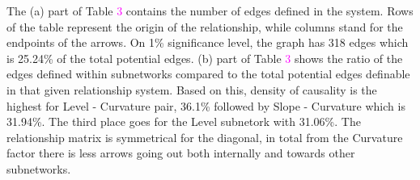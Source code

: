 \documentclass[12pt,bibliography=totoc]{article}
\begin{document}

\bigskip


The (a) part of Table \textcolor{magenta}{3} contains the number of edges defined in the system. Rows of the table represent the origin of the relationship, while columns stand for the endpoints of the arrows. On 1\% significance level, the graph has 318 edges which is 25.24\% of the total potential edges. (b) part of Table \textcolor{magenta}{3} shows the ratio of the edges defined within subnetworks compared to the total potential edges definable in that given relationship system. Based on this, density of causality is the highest for Level - Curvature pair, 36.1\% followed by Slope - Curvature which is 31.94\%. The third place goes for the Level subnetork with 31.06\%. The relationship matrix is symmetrical for the diagonal, in total from the Curvature factor there is less arrows going out both internally and towards other subnetworks.

\end{document}
